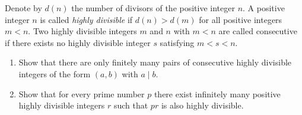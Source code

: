 Denote by $d(n)$ the number of divisors of the positive integer $n$. A positive integer $n$ is called \emph{highly divisible} if $d(n) > d(m)$ for all positive integers $m < n$. Two highly divisible integers $m$ and $n$ with $m < n$ are called consecutive if there exists no highly divisible integer $s$ satisfying $m < s < n$.
\begin{enumerate}
\item[(a)] Show that there are only finitely many pairs of consecutive highly divisible integers of the form $(a, b)$ with $a \mid b$.
\item[(b)] Show that for every prime number $p$ there exist infinitely many positive highly divisible integers $r$ such that $pr$ is also highly divisible.
\end{enumerate}
